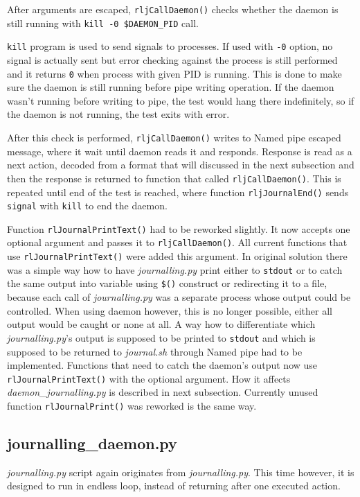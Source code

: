 After arguments are escaped, \texttt{rljCallDaemon()} checks whether the daemon is still running with \texttt{kill -0 \$DAEMON\_PID} call. 

\texttt{kill} program is used to send signals to processes. If used with \texttt{-0} option, no signal is actually sent but error checking against the process is still performed and it returns \texttt{0} when process with given PID is running\cite{man_kill}. This is done to make sure the daemon is still running before pipe writing operation.  If the daemon wasn't running before writing to pipe, the test would hang there indefinitely, so if the daemon is not running, the test exits with error.

After this check is performed, \texttt{rljCallDaemon()} writes to Named pipe escaped message, where it wait until daemon reads it and responds. Response is read as a next action, decoded from a format that will discussed in the next subsection and then the response is returned to function that called \texttt{rljCallDaemon()}. 
This is repeated until end of the test is reached, where function \texttt{rljJournalEnd()} sends \texttt{signal} with \texttt{kill} to end the daemon.

Function \texttt{rlJournalPrintText()} had to be reworked slightly. It now accepts one optional argument and passes it to \texttt{rljCallDaemon()}. All current functions that use \texttt{rlJournalPrintText()} were added this argument. In original solution there was a simple way how to have \textit{journalling.py} print either to \texttt{stdout} or to catch the same output into variable using  \texttt{\$()} construct or redirecting it to a file, because each call of  \textit{journalling.py} was a separate process whose output could be controlled. When using daemon however, this is no longer possible, either all output would be caught or none at all.
A way how to differentiate which \textit{journalling.py}'s output is supposed to be printed to \texttt{stdout} and which is supposed to be returned to \textit{journal.sh} through Named pipe had to be implemented. Functions that need to catch the daemon's output now use  \texttt{rlJournalPrintText()} with the optional argument. How it affects \textit{daemon\_journalling.py} is described in next subsection.
Currently unused function \texttt{rlJournalPrint()} was reworked is the same way.

\subsection{journalling\_daemon.py}
\textit{journalling.py} script again originates from \textit{journalling.py}. This time however, it is designed to run in endless loop, instead of returning after one executed action.


